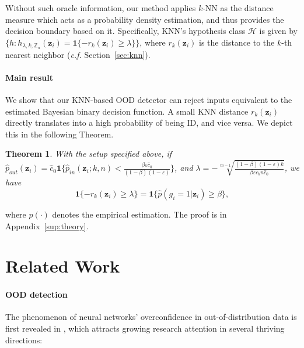\documentclass[nohyperref]{article}
\newcommand{\bz}{\mathbf{z}}
\newcommand{\method}{{KNN}}
\theoremstyle{plain}
\newtheorem{theorem}{Theorem}[section]
\theoremstyle{definition}
\theoremstyle{remark}
\begin{document}
Without such oracle information, our method applies $k$-NN as the distance measure which acts as a probability density estimation, and thus provides the decision boundary based on it. Specifically, \method's hypothesis class $\mathcal{H}$ is given by $\{h:h_{\lambda, k, \mathbb{Z}_n}(\bz_i) = \mathbf{1}\{-r_k(\bz_i) \ge \lambda\}\}$, where $r_k(\bz_i)$ is the distance to the $k$-th nearest neighbor (\emph{c.f.} Section~\ref{sec:knn}). 


\paragraph{Main result} We show that our KNN-based OOD detector can reject inputs equivalent to the estimated Bayesian binary decision function. A small KNN distance $r_k(\bz_i)$ directly translates into a high probability of being ID, and vice versa. We depict this in the following Theorem.

\begin{theorem} 
\label{th:knn2bayes}
With the setup specified above, if $\hat{p}_{out}(\bz_i) = \hat{c}_{0}\mathbf{1}\{\hat{p}_{in}(\bz_i;k, n) < \frac{\beta\varepsilon\hat{c}_{0}}{(1-\beta)(1-\varepsilon)}\}$, and $\lambda = -\sqrt[m-1]{\frac{(1-\beta)(1 - \varepsilon) k}{\beta\varepsilon c_bn \hat{c}_{0}}}$, we have
$$
\mathbf{1}\{-r_k(\bz_i) \ge \lambda\} = \mathbf{1}\{\hat{p}(g_i = 1|\bz_i) \ge \beta\},
$$
\end{theorem}
where $\hat{p}(\cdot)$ denotes the empirical estimation. The proof is in Appendix~\ref{sup:theory}. 




\section{Related Work}
\label{sec:related}

\paragraph{OOD detection}
The phenomenon of neural networks' overconfidence in out-of-distribution data is first revealed in \cite{nguyen2015deep}, which attracts growing research attention in several thriving directions:
\end{document}
